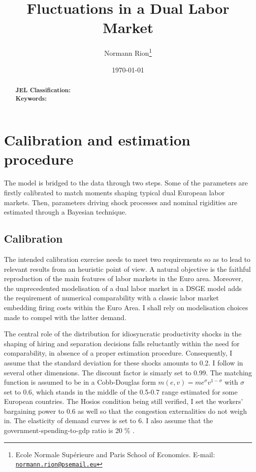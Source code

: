 \documentclass[a4paper]{article}
\title{\textbf{Fluctuations in a Dual Labor Market}}
\author{Normann Rion\footnote{Ecole Normale Supérieure and Paris School of Economics. E-mail: \href{mailto:normann.rion@psemail.eu}{\texttt{normann.rion@psemail.eu}}}}
\date{\today}
\begin{document}
\maketitle

\begin{abstract}
\textbf{JEL Classification:} \\
\textbf{Keywords:} 
\end{abstract}




\section{Calibration and estimation procedure}

The model is bridged to the data through two steps. Some of the parameters are firstly calibrated to match moments shaping typical dual European labor markets. Then, parameters driving shock processes and nominal rigidities are estimated through a Bayesian technique. 

\subsection{Calibration}

The intended calibration exercise needs to meet two requirements so as to lead to relevant results from an heuristic point of view. A natural objective is the faithful reproduction of the main features of labor markets in the Euro area. Moreover, the unprecedented modelisation of a dual labor market in a DSGE model adds the requirement of numerical comparability with a classic labor market embedding firing costs within the Euro Area. I shall rely on modelisation choices \citet{thomas2009labor} made to compel with the latter demand.

The central role of the distribution for idiosyncratic productivity shocks in the shaping of hiring and separation decisions falls reluctantly within the need for comparability, in absence of a proper estimation procedure. Consequently, I assume that the standard deviation for these shocks amounts to 0.2. I follow \citet{thomas2009labor} in several other dimensions. The discount factor is simarly set to 0.99. The matching function is assumed to be in a Cobb-Douglas form $m\left(e,v\right) = m e^{\sigma} v^{1-\sigma}$ with $\sigma$ set to 0.6, which stands in the middle of the 0.5-0.7 range \citet{burda1994gross} estimated for some European countries. The Hosios condition being still verified, I set the workers' bargaining power to 0.6 as well so that the congestion externalities do not weigh in. The elasticity of demand curves is set to 6. I also assume that the government-spending-to-gdp ratio is 20 \% .
\end{document}
